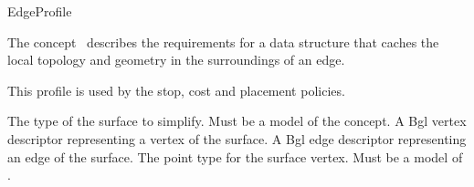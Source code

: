 
\begin{ccRefConcept}{EdgeProfile}


\ccDefinition

The concept \ccRefName\ describes the requirements for a data structure that caches the local topology and geometry in the surroundings of an edge.

This profile is used by the stop, cost and placement policies.

\ccTypes
  {The type of the surface to simplify. Must be a model of the  concept.}{}
\ccGlue    
  {A {\sc Bgl} vertex descriptor representing a vertex of the surface.}
\ccGlue    
  {A {\sc Bgl} edge descriptor representing an edge of the surface.}
\ccGlue    
  {The point type for the surface vertex.  Must be a model of .}



\end{ccRefConcept}
